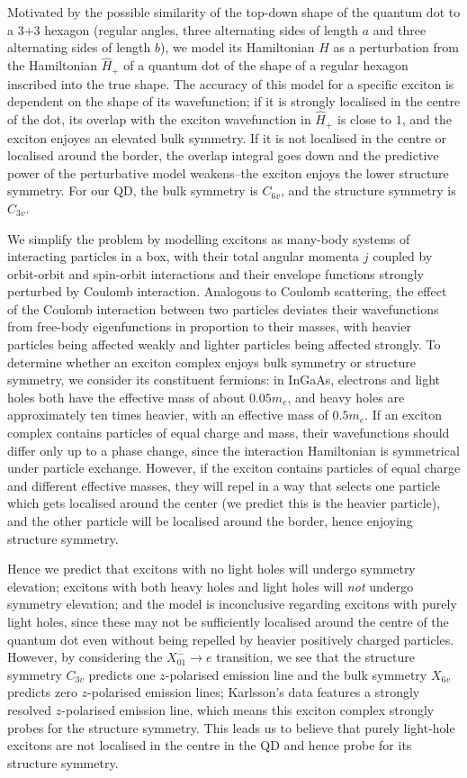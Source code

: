 \documentclass[12pt]{article}
\begin{document}
	Motivated by the possible similarity of the top-down shape of the quantum dot to a 3+3 hexagon (regular angles, three alternating sides of length $a$ and three alternating sides of length $b$), we model its Hamiltonian $\hat{H}$ as a perturbation from the Hamiltonian $\hat{H}_+$ of a quantum dot of the shape of a regular hexagon inscribed into the true shape. The accuracy of this model for a specific exciton is dependent on the shape of its wavefunction; if it is strongly localised in the centre of the dot, its overlap with the exciton wavefunction in $\hat{H}_+$ is close to $1$, and the exciton enjoyes an elevated bulk symmetry. If it is not localised in the centre or localised around the border, the overlap integral goes down and the predictive power of the perturbative model weakens--the exciton enjoys the lower structure symmetry. For our QD, the bulk symmetry is $C_{6v}$, and the structure symmetry is $C_{3v}$.
	
	We simplify the problem by modelling excitons as many-body systems of interacting particles in a box, with their total angular momenta $j$ coupled by orbit-orbit and spin-orbit interactions and their envelope functions strongly perturbed by Coulomb interaction. Analogous to Coulomb scattering, the effect of the Coulomb interaction between two particles deviates their wavefunctions from free-body eigenfunctions in proportion to their masses, with heavier particles being affected weakly and lighter particles being affected strongly. To determine whether an exciton complex enjoys bulk symmetry or structure symmetry, we consider its constituent fermions: in InGaAs, electrons and light holes both have the effective mass of about $0.05m_e$, and heavy holes are approximately ten times heavier, with an effective mass of $0.5m_e$. If an exciton complex contains particles of equal charge and mass, their wavefunctions should differ only up to a phase change, since the interaction Hamiltonian is symmetrical under particle exchange. However, if the exciton contains particles of equal charge and different effective masses, they will repel in a way that selects one particle which gets localised around the center (we predict this is the heavier particle), and the other particle will be localised around the border, hence enjoying structure symmetry.
	
	Hence we predict that excitons with no light holes will undergo symmetry elevation; excitons with both heavy holes and light holes will \textit{not} undergo symmetry elevation; and the model is inconclusive regarding excitons with purely light holes, since these may not be sufficiently localised around the centre of the quantum dot even without being repelled by heavier positively charged particles. However, by considering the $X^-_{01}\to e$ transition, we see that the structure symmetry $C_{3v}$ predicts one $z$-polarised emission line and the bulk symmetry $X_{6v}$ predicts zero $z$-polarised emission lines; Karlsson's data features a strongly resolved $z$-polarised emission line, which means this exciton complex strongly probes for the structure symmetry. This leads us to believe that purely light-hole excitons are not localised in the centre in the QD and hence probe for its structure symmetry.
	
\end{document}
